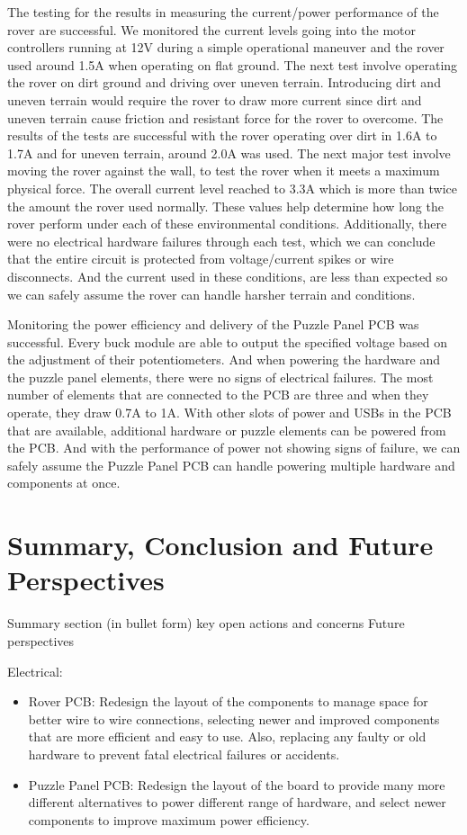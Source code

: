 \documentclass[a4paper, 10pt]{article}
\begin{document}
The testing for the results in measuring the current/power performance of the rover are successful. We monitored the current levels going into the motor controllers running at 12V during a simple operational maneuver and the rover used around 1.5A when operating on flat ground. The next test involve operating the rover on dirt ground and driving over uneven terrain. Introducing dirt and uneven terrain would require the rover to draw more current since dirt and uneven terrain cause friction and resistant force for the rover to overcome. The results of the tests are successful with the rover operating over dirt in 1.6A to 1.7A and for uneven terrain, around 2.0A was used. The next major test involve moving the rover against the wall, to test the rover when it meets a maximum physical force. The overall current level reached to 3.3A which is more than twice the amount the rover used normally. These values help determine how long the rover perform under each of these environmental conditions. Additionally, there were no electrical hardware failures through each test, which we can conclude that the entire circuit is protected from voltage/current spikes or wire disconnects. And the current used in these conditions, are less than expected so we can safely assume the rover can handle harsher terrain and conditions.

Monitoring the power efficiency and delivery of the Puzzle Panel PCB was successful. Every buck module are able to output the specified voltage based on the adjustment of their potentiometers. And when powering the hardware and the puzzle panel elements, there were no signs of electrical failures. The most number of elements that are connected to the PCB are three and when they operate, they draw 0.7A to 1A. With other slots of power and USBs in the PCB that are available, additional hardware or puzzle elements can be powered from the PCB. And with the performance of power not showing signs of failure, we can safely assume the Puzzle Panel PCB can handle powering multiple hardware and components at once.

\section{Summary, Conclusion and Future Perspectives}
Summary section (in bullet form)
key open actions and concerns
Future perspectives 

Electrical:

\begin{itemize}
\item
Rover PCB: Redesign the layout of the components to manage space for better wire to wire connections, selecting newer and improved components that are more efficient and easy to use. Also, replacing any faulty or old hardware to prevent fatal electrical failures or accidents. 

\item
Puzzle Panel PCB: Redesign the layout of the board to provide many more different alternatives to power different range of hardware, and select newer components to improve maximum power efficiency.

\end{itemize}
\end{document}

